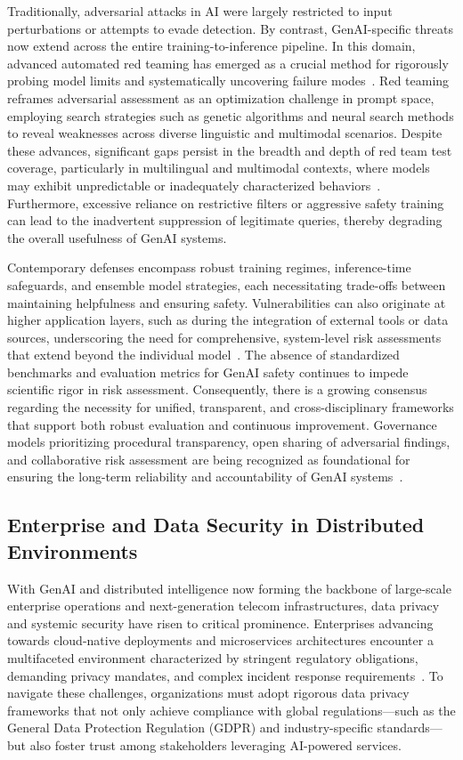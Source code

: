 \documentclass[sigconf]{acmart}
\begin{document}
Traditionally, adversarial attacks in AI were largely restricted to input perturbations or attempts to evade detection. By contrast, GenAI-specific threats now extend across the entire training-to-inference pipeline. In this domain, advanced automated red teaming has emerged as a crucial method for rigorously probing model limits and systematically uncovering failure modes~\cite{ref3}. Red teaming reframes adversarial assessment as an optimization challenge in prompt space, employing search strategies such as genetic algorithms and neural search methods to reveal weaknesses across diverse linguistic and multimodal scenarios. Despite these advances, significant gaps persist in the breadth and depth of red team test coverage, particularly in multilingual and multimodal contexts, where models may exhibit unpredictable or inadequately characterized behaviors~\cite{ref3}. Furthermore, excessive reliance on restrictive filters or aggressive safety training can lead to the inadvertent suppression of legitimate queries, thereby degrading the overall usefulness of GenAI systems.

Contemporary defenses encompass robust training regimes, inference-time safeguards, and ensemble model strategies, each necessitating trade-offs between maintaining helpfulness and ensuring safety. Vulnerabilities can also originate at higher application layers, such as during the integration of external tools or data sources, underscoring the need for comprehensive, system-level risk assessments that extend beyond the individual model~\cite{ref3}. The absence of standardized benchmarks and evaluation metrics for GenAI safety continues to impede scientific rigor in risk assessment. Consequently, there is a growing consensus regarding the necessity for unified, transparent, and cross-disciplinary frameworks that support both robust evaluation and continuous improvement. Governance models prioritizing procedural transparency, open sharing of adversarial findings, and collaborative risk assessment are being recognized as foundational for ensuring the long-term reliability and accountability of GenAI systems~\cite{ref3,ref7}.

\subsection{Enterprise and Data Security in Distributed Environments}

With GenAI and distributed intelligence now forming the backbone of large-scale enterprise operations and next-generation telecom infrastructures, data privacy and systemic security have risen to critical prominence. Enterprises advancing towards cloud-native deployments and microservices architectures encounter a multifaceted environment characterized by stringent regulatory obligations, demanding privacy mandates, and complex incident response requirements~\cite{ref17,ref18,ref19}. To navigate these challenges, organizations must adopt rigorous data privacy frameworks that not only achieve compliance with global regulations---such as the General Data Protection Regulation (GDPR) and industry-specific standards---but also foster trust among stakeholders leveraging AI-powered services.
\end{document}
